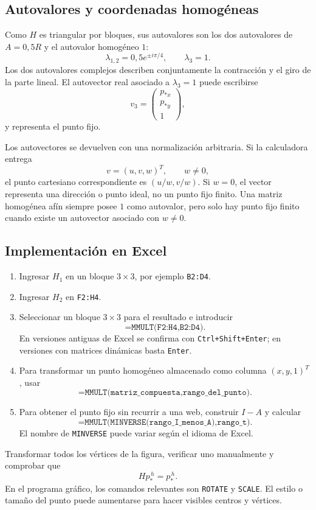 \subsection{Autovalores y coordenadas homogéneas}

Como \(H\) es triangular por bloques, sus autovalores son los dos autovalores de \(A=0{,}5R\)
y el autovalor homogéneo \(1\):
\[
\lambda_{1,2}=0{,}5e^{\pm i\pi/4},
\qquad
\lambda_3=1.
\]
Los dos autovalores complejos describen conjuntamente la contracción y el giro de la parte
lineal. El autovector real asociado a \(\lambda_3=1\) puede escribirse
\[
v_3=
\begin{pmatrix}p_{\ast x}\\p_{\ast y}\\1\end{pmatrix},
\]
y representa el punto fijo.

\begin{atencion}
Los autovectores se devuelven con una normalización arbitraria. Si la calculadora entrega
\[
v=(u,v,w)^T,\qquad w\neq0,
\]
el punto cartesiano correspondiente es \((u/w,v/w)\). Si \(w=0\), el vector representa una
dirección o punto ideal, no un punto fijo finito. Una matriz homogénea afín siempre posee
\(1\) como autovalor, pero solo hay punto fijo finito cuando existe un autovector asociado
con \(w\neq0\).
\end{atencion}

\subsection{Implementación en Excel}

\begin{enumerate}
  \item Ingresar \(H_1\) en un bloque \(3\times3\), por ejemplo
  \texttt{B2:D4}.
  \item Ingresar \(H_2\) en \texttt{F2:H4}.
  \item Seleccionar un bloque \(3\times3\) para el resultado e introducir
  \[
  \texttt{=MMULT(F2:H4,B2:D4)}.
  \]
  En versiones antiguas de Excel se confirma con
  \texttt{Ctrl+Shift+Enter}; en versiones con matrices dinámicas basta \texttt{Enter}.
  \item Para transformar un punto homogéneo almacenado como columna
  \((x,y,1)^T\), usar
  \[
  \texttt{=MMULT(matriz\_compuesta,rango\_del\_punto)}.
  \]
  \item Para obtener el punto fijo sin recurrir a una web, construir \(I-A\) y calcular
  \[
  \texttt{=MMULT(MINVERSE(rango\_I\_menos\_A),rango\_t)}.
  \]
  El nombre de \texttt{MINVERSE} puede variar según el idioma de Excel.
\end{enumerate}

\begin{idea}
Transformar todos los vértices de la figura, verificar uno manualmente y comprobar que
\[
Hp_\ast^{\,h}=p_\ast^{\,h}.
\]
En el programa gráfico, los comandos relevantes son \texttt{ROTATE} y
\texttt{SCALE}. El estilo o tamaño del punto puede aumentarse para hacer visibles centros y
vértices.
\end{idea}

